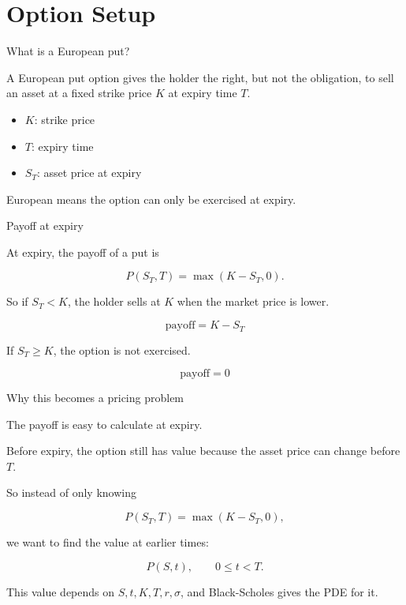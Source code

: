 \section{Option Setup}

\begin{frame}{What is a European put?}

A European put option gives the holder the right, but not the obligation, to sell an asset at a fixed strike price \(K\) at expiry time \(T\).


\begin{itemize}
    \item \(K\): strike price
    \item \(T\): expiry time
    \item \(S_T\): asset price at expiry
\end{itemize}


European means the option can only be exercised at expiry.

\end{frame}


\begin{frame}{Payoff at expiry}

At expiry, the payoff of a put is

\[
P(S_T,T)=\max(K-S_T,0).
\]


So if \(S_T<K\), the holder sells at \(K\) when the market price is lower.

\[
\text{payoff}=K-S_T
\]

If \(S_T\geq K\), the option is not exercised.

\[
\text{payoff}=0
\]

\end{frame}


\begin{frame}{Why this becomes a pricing problem}

The payoff is easy to calculate at expiry.



Before expiry, the option still has value because the asset price can change before \(T\).



So instead of only knowing

\[
P(S_T,T)=\max(K-S_T,0),
\]

we want to find the value at earlier times:

\[
P(S,t), \qquad 0\leq t<T.
\]



This value depends on \(S,t,K,T,r,\sigma\), and Black-Scholes gives the PDE for it.

\end{frame}